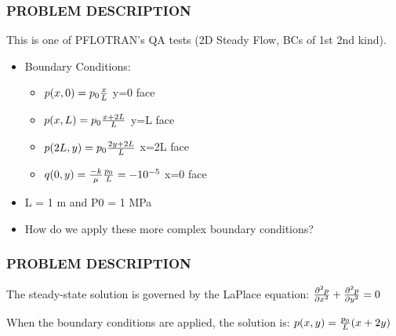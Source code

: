 \documentclass{beamer}
\begin{document}
\begin{frame}\frametitle{PROBLEM DESCRIPTION}

This is one of PFLOTRAN's QA tests (2D Steady Flow, BCs of 1st 2nd kind).
  \begin{itemize}
    \item Boundary Conditions:
    \begin{itemize}
      \item $p(x,0) = p_0 {x \over L} $  \hspace{0.25in} y=0 \hspace{0.15in} face
      \item $p(x,L) = p_0 {{x+2L} \over L} $  \hspace{0.25in} y=L \hspace{0.15in} face
      \item $p(2L,y) = p_0 {{2y+2L} \over L} $  \hspace{0.25in} x=2L \hspace{0.15in} face
      \item $q(0,y) = {{-k}\over{\mu}}{p_0 \over L} = -10^{-5} $  \hspace{0.25in} x=0 \hspace{0.15in} face
    \end{itemize}
  \item L = 1 m and P0 = 1 MPa  
  \item How do we apply these more complex boundary conditions?
  \end{itemize}

\end{frame}

\begin{frame}\frametitle{PROBLEM DESCRIPTION}

The steady-state solution is governed by the LaPlace equation:
\Large 
\vspace{0.25 in}
${{\partial^{2} p} \over {\partial x^{2}}} + {{\partial^{2} p} \over {\partial y^{2}}} = 0$ 
  
\vspace{0.50 in}  
\normalsize  
When the boundary conditions are applied, the solution is:
\Large 
\vspace{0.25 in}
$p(x,y) = {p_0 \over L} (x+2y)$

\end{frame}
\end{document}
